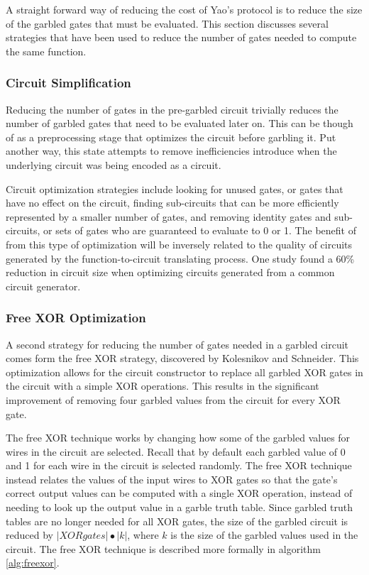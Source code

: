 A straight forward way of reducing the cost of Yao's protocol is to reduce the size of the garbled gates that must be evaluated. This section discusses several strategies that have been used to reduce the number of gates needed to compute the same function.

\subsubsection{Circuit Simplification}

Reducing the number of gates in the pre-garbled circuit trivially reduces the number of garbled gates that need to be evaluated later on.  This can be though of as a preprocessing stage that optimizes the circuit before garbling it.  Put another way, this state attempts to remove inefficiencies introduce when the underlying circuit was being encoded as a circuit.

Circuit optimization strategies include looking for unused gates, or gates that have no effect on the circuit, finding sub-circuits that can be more efficiently represented by a smaller number of gates, and removing identity gates and sub-circuits, or sets of gates who are guaranteed to evaluate to 0 or 1\cite{kreuter2012billion, pinkas2009secure}.  The benefit of from this type of optimization will be inversely related to the quality of circuits generated by the function-to-circuit translating process.  One study\cite{pinkas2009secure} found a 60\% reduction in circuit size when optimizing circuits generated from a common circuit generator\cite{malkhi2004fairplay}.


\subsubsection{Free XOR Optimization}
\label{sec:freexoropt}

A second strategy for reducing the number of gates needed in a garbled circuit comes form the free XOR strategy, discovered by Kolesnikov and Schneider\cite{kolesnikov2008improved}.  This optimization allows for the circuit constructor to replace all garbled XOR gates in the circuit with a simple XOR operations. This results in the significant improvement of removing four garbled values from the circuit for every XOR gate.

The free XOR technique works by changing how some of the garbled values for wires in the circuit are selected. Recall that by default each garbled value of 0 and 1 for each wire in the circuit is selected randomly.  The free XOR technique instead relates the values of the input wires to XOR gates so that the gate's correct output values can be computed with a single XOR operation, instead of needing to look up the output value in a garble truth table. Since garbled truth tables are no longer needed for all XOR gates, the size of the garbled circuit is reduced by $|XOR gates| \bullet |k|$, where $k$ is the size of the garbled values used in the circuit. The free XOR technique is described more formally in algorithm \ref{alg:freexor}.

